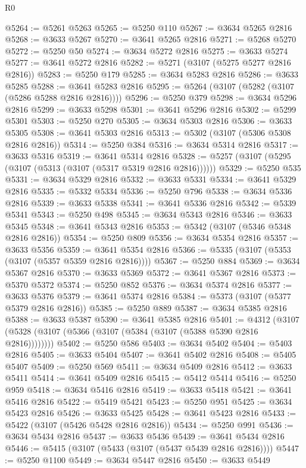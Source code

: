 \begin{lexlean}{R0}
\begin{coremodule}
@5264 := @5261 @5263
@5265 := @5250 @110
@5267 := @3634 @5265 @2816
@5268 := @3633 @5267
@5270 := @3641 @5265 @2816
@5271 := @5268 @5270
@5272 := @5250 @50
@5274 := @3634 @5272 @2816
@5275 := @3633 @5274
@5277 := @3641 @5272 @2816
@5282 := @5271 (@3107 (@5275 @5277 @2816 @2816))
@5283 := @5250 @179
@5285 := @3634 @5283 @2816
@5286 := @3633 @5285
@5288 := @3641 @5283 @2816
@5295 := @5264 (@3107 (@5282 (@3107 (@5286 @5288 @2816 @2816))))
@5296 := @5250 @379
@5298 := @3634 @5296 @2816
@5299 := @3633 @5298
@5301 := @3641 @5296 @2816
@5302 := @5299 @5301
@5303 := @5250 @270
@5305 := @3634 @5303 @2816
@5306 := @3633 @5305
@5308 := @3641 @5303 @2816
@5313 := @5302 (@3107 (@5306 @5308 @2816 @2816))
@5314 := @5250 @384
@5316 := @3634 @5314 @2816
@5317 := @3633 @5316
@5319 := @3641 @5314 @2816
@5328 := @5257 (@3107 (@5295 (@3107 (@5313 (@3107 (@5317 @5319 @2816 @2816))))))
@5329 := @5250 @535
@5331 := @3634 @5329 @2816
@5332 := @3633 @5331
@5334 := @3641 @5329 @2816
@5335 := @5332 @5334
@5336 := @5250 @796
@5338 := @3634 @5336 @2816
@5339 := @3633 @5338
@5341 := @3641 @5336 @2816
@5342 := @5339 @5341
@5343 := @5250 @498
@5345 := @3634 @5343 @2816
@5346 := @3633 @5345
@5348 := @3641 @5343 @2816
@5353 := @5342 (@3107 (@5346 @5348 @2816 @2816))
@5354 := @5250 @809
@5356 := @3634 @5354 @2816
@5357 := @3633 @5356
@5359 := @3641 @5354 @2816
@5366 := @5335 (@3107 (@5353 (@3107 (@5357 @5359 @2816 @2816))))
@5367 := @5250 @884
@5369 := @3634 @5367 @2816
@5370 := @3633 @5369
@5372 := @3641 @5367 @2816
@5373 := @5370 @5372
@5374 := @5250 @852
@5376 := @3634 @5374 @2816
@5377 := @3633 @5376
@5379 := @3641 @5374 @2816
@5384 := @5373 (@3107 (@5377 @5379 @2816 @2816))
@5385 := @5250 @889
@5387 := @3634 @5385 @2816
@5388 := @3633 @5387
@5390 := @3641 @5385 @2816
@5401 := @4312 (@3107 (@5328 (@3107 (@5366 (@3107 (@5384 (@3107 (@5388 @5390 @2816 @2816))))))))
@5402 := @5250 @586
@5403 := @3634 @5402
@5404 := @5403 @2816
@5405 := @3633 @5404
@5407 := @3641 @5402 @2816
@5408 := @5405 @5407
@5409 := @5250 @569
@5411 := @3634 @5409 @2816
@5412 := @3633 @5411
@5414 := @3641 @5409 @2816
@5415 := @5412 @5414
@5416 := @5250 @959
@5418 := @3634 @5416 @2816
@5419 := @3633 @5418
@5421 := @3641 @5416 @2816
@5422 := @5419 @5421
@5423 := @5250 @951
@5425 := @3634 @5423 @2816
@5426 := @3633 @5425
@5428 := @3641 @5423 @2816
@5433 := @5422 (@3107 (@5426 @5428 @2816 @2816))
@5434 := @5250 @991
@5436 := @3634 @5434 @2816
@5437 := @3633 @5436
@5439 := @3641 @5434 @2816
@5446 := @5415 (@3107 (@5433 (@3107 (@5437 @5439 @2816 @2816))))
@5447 := @5250 @1100
@5449 := @3634 @5447 @2816
@5450 := @3633 @5449

\end{coremodule}
\end{lexlean}
